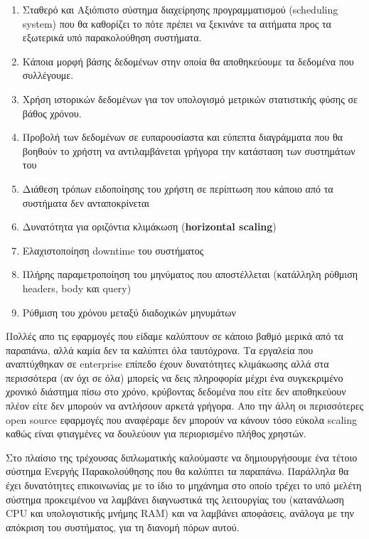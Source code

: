 \begin{enumerate}
	\item Σταθερό και Αξιόπιστο σύστημα διαχείρησης προγραμματισμού (scheduling system) που θα
		καθορίζει το πότε πρέπει να ξεκινάνε τα αιτήματα προς τα εξωτερικά υπό παρακολούθηση συστήματα.
	\item Κάποια μορφή βάσης δεδομένων στην οποία θα αποθηκεύουμε τα δεδομένα που συλλέγουμε.
	\item Χρήση ιστορικών δεδομένων για τον υπολογισμό μετρικών στατιστικής φύσης σε βάθος χρόνου.
	\item Προβολή των δεδομένων σε ευπαρουσίαστα και εύπεπτα διαγράμματα που θα βοηθούν το χρήστη να αντιλαμβάνεται
		γρήγορα την κατάσταση των συστημάτων του
	\item Διάθεση τρόπων ειδοποίησης του χρήστη σε περίπτωση που κάποιο από τα συστήματα δεν ανταποκρίνεται
	\item Δυνατότητα για οριζόντια κλιμάκωση (\textbf{horizontal scaling})
	\item Ελαχιστοποίηση downtime του συστήματος 
	\item Πλήρης παραμετροποίηση του μηνύματος που αποστέλλεται (κατάλληλη ρύθμιση headers, body και query)
	\item Ρύθμιση του χρόνου μεταξύ διαδοχικών μηνυμάτων
\end{enumerate}

Πολλές απο τις εφαρμογές που είδαμε καλύπτουν σε κάποιο βαθμό μερικά από τα παραπάνω, αλλά καμία
δεν τα καλύπτει όλα ταυτόχρονα. Τα εργαλεία που αναπτύχθηκαν σε enterprise επίπεδο έχουν δυνατότητες κλιμάκωσης
αλλά στα περισσότερα (αν όχι σε όλα) μπορείς να δεις πληροφορία μέχρι ένα συγκεκριμένο χρονικό διάστημα πίσω στο χρόνο,
κρύβοντας δεδομένα που είτε δεν αποθηκεύουν πλέον είτε δεν μπορούν να αντλήσουν αρκετά γρήγορα.
Απο την άλλη οι περισσότερες open source εφαρμογές που αναφέραμε δεν μπορούν να κάνουν τόσο εύκολα scaling
καθώς είναι φτιαγμένες να δουλεύουν για περιορισμένο πλήθος χρηστών. 

Στο πλαίσιο της τρέχουσας διπλωματικής καλούμαστε να δημιουργήσουμε ένα τέτοιο σύστημα Ενεργής Παρακολούθησης που θα καλύπτει τα παραπάνω. Παράλληλα θα έχει δυνατότητες επικοινωνίας με το ίδιο το μηχάνημα στο οποίο τρέχει το υπό μελέτη σύστημα προκειμένου να λαμβάνει διαγνωστικά της λειτουργίας του (κατανάλωση CPU και υπολογιστικής μνήμης RAM) και να λαμβάνει αποφάσεις, ανάλογα με την απόκριση του συστήματος, για τη διανομή πόρων αυτού.

